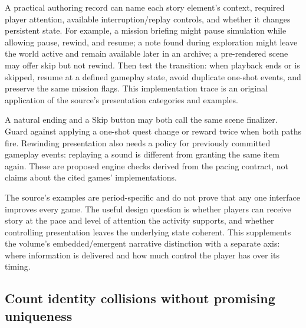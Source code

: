 A practical authoring record can name each story element's context, required player attention, available interruption/replay controls, and whether it changes persistent state. For example, a mission briefing might pause simulation while allowing pause, rewind, and resume; a note found during exploration might leave the world active and remain available later in an archive; a pre-rendered scene may offer skip but not rewind. Then test the transition: when playback ends or is skipped, resume at a defined gameplay state, avoid duplicate one-shot events, and preserve the same mission flags. This implementation trace is an original application of the source's presentation categories and examples.

A natural ending and a Skip button may both call the same scene finalizer. Guard against applying a one-shot quest change or reward twice when both paths fire. Rewinding presentation also needs a policy for previously committed gameplay events: replaying a sound is different from granting the same item again. These are proposed engine checks derived from the pacing contract, not claims about the cited games' implementations.

The source's examples are period-specific and do not prove that any one interface improves every game. The useful design question is whether players can receive story at the pace and level of attention the activity supports, and whether controlling presentation leaves the underlying state coherent. This supplements the volume's embedded/emergent narrative distinction with a separate axis: where information is delivered and how much control the player has over its timing.

\subsection{Count identity collisions without promising uniqueness}\label{count-identity-collisions-without-promising-uniqueness}

